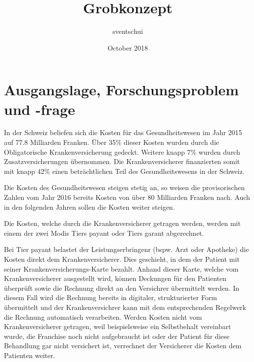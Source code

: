\documentclass{article}
\title{Grobkonzept}
\author{sventschui }
\date{October 2018}
\begin{document}
\maketitle

\section{Ausgangslage, Forschungsproblem und -frage}


In der Schweiz beliefen sich die Kosten für das Gesundheitswesen im Jahr 2015 auf 77.8 Milliarden Franken. Über 35\% dieser Kosten wurden durch die Obligatorische Krankenversicherung gedeckt. Weitere knapp 7\% wurden durch Zusatzversicherungen übernommen. Die Krankenversicherer finanzierten somit mit knapp 42\% einen beträchtlichen Teil des Gesundheitswesens in der Schweiz.

Die Kosten des Gesundheitswesen steigen stetig an, so weisen die provisorischen Zahlen vom Jahr 2016 bereits Kosten von über 80 Milliarden Franken nach. Auch in den folgenden Jahren sollen die Kosten weiter steigen.

Die Kosten, welche durch die Krankenversicherer getragen werden, werden mit einem der zwei Modis Tiers payant oder Tiers garant abgerechnet. 

Bei Tier payant belastet der Leistungserbringenr (bspw. Arzt oder Apotheke) die Kosten direkt dem Krankenversicherer. Dies geschieht, in dem der Patient mit seiner Krankenversicherungs-Karte bezahlt. Anhand dieser Karte, welche vom Krankenversicherer ausgestellt wird, können Deckungen für den Patienten überprüft sowie die Rechnung direkt an den Versichrer übermittelt werden. In diesem Fall wird die Rechnung bereits in digitaler, strukturierter Form übermittelt und der Krankenversichrer kann mit dem entsprechenden Regelwerk die Rechnung automatisch verarbeiten. Werden Kosten nicht vom Krankenversicherer getragen, weil beispielsweise ein Selbstbehalt vereinbart wurde, die Franchise noch nicht aufgebraucht ist oder der Patient für diese Behandlung gar nicht versichert ist, verrechnet der Versicherer die Kosten dem Patienten weiter.
\end{document}
